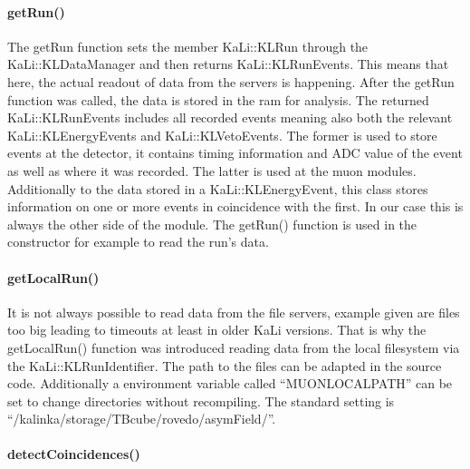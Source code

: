     \paragraph{getRun()}
    \label{ch:Analysis software:sec:methods of the class run:subsec:getRun()}
    
    The getRun function sets the member KaLi::KLRun through the KaLi::KLDataManager and then returns KaLi::KLRunEvents. This means that here, the actual readout of data from the servers is happening. After the getRun function was called, the data is stored in the ram for analysis. The returned KaLi::KLRunEvents includes all recorded events meaning also both the relevant KaLi::KLEnergyEvents and KaLi::KLVetoEvents. The former is used to store events at the detector, it contains timing information and ADC value of the event as well as where it was recorded. The latter is used at the muon modules. Additionally to the data stored in a KaLi::KLEnergyEvent, this class stores information on one or more events in coincidence with the first. In our case this is always the other side of the module. The getRun() function is used in the constructor for example to read the run's data.
    
    \paragraph{getLocalRun()}
    \label{ch:Analysis software:sec:methods of the class run:subsec:getLocalRun()}
    
    It is not always possible to read data from the file servers, example given are files too big leading to timeouts at least in older KaLi versions. That is why the getLocalRun() function was introduced reading data from the local filesystem via the KaLi::KLRunIdentifier. The path to the files can be adapted in the source code. Additionally a environment variable called ``MUONLOCALPATH'' can be set to change directories without recompiling. The standard setting is ``/kalinka/storage/TBcube/rovedo/asymField/''.
    
    \paragraph{detectCoincidences()}
    \label{ch:Analysis software:sec:methods of the class run:subsec:detectCoincidences()}
    
